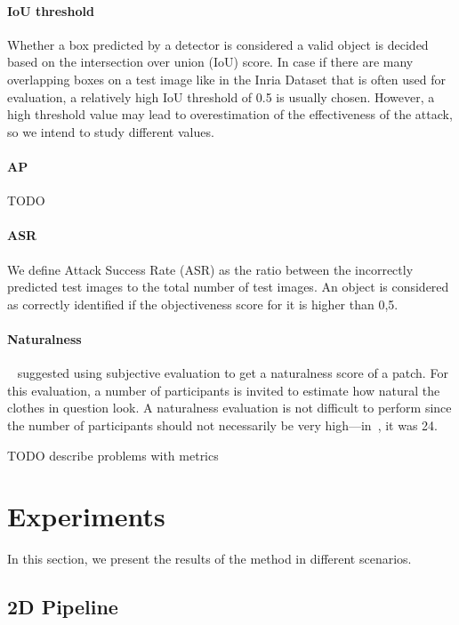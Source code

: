 \paragraph{IoU threshold}
Whether a box predicted by a detector is considered a valid object is decided based on the intersection over union (IoU) score.
In case if there are many overlapping boxes on a test image like in the Inria Dataset that is often used for evaluation, a relatively high IoU threshold of 0.5 is usually chosen.
However, a high threshold value may lead to overestimation of the effectiveness of the attack, so we intend to study different values.

\paragraph{AP} 
TODO 

\paragraph{ASR}
We define Attack Success Rate (ASR) as the ratio between the incorrectly predicted test images to the total number of test images.
An object is considered as correctly identified if the objectiveness score for it is higher than 0,5.

\paragraph{Naturalness}
~\cite{dog_patch_clothes} suggested using subjective evaluation to get a naturalness score of a patch.
For this evaluation, a number of participants is invited to estimate how natural the clothes in question look.
A naturalness evaluation is not difficult to perform since the number of participants should not necessarily be very high---in~\cite{dog_patch_clothes}, it was 24.

TODO describe problems with metrics

\section{Experiments}

In this section, we present the results of the method in different scenarios.

\subsection{2D Pipeline}

